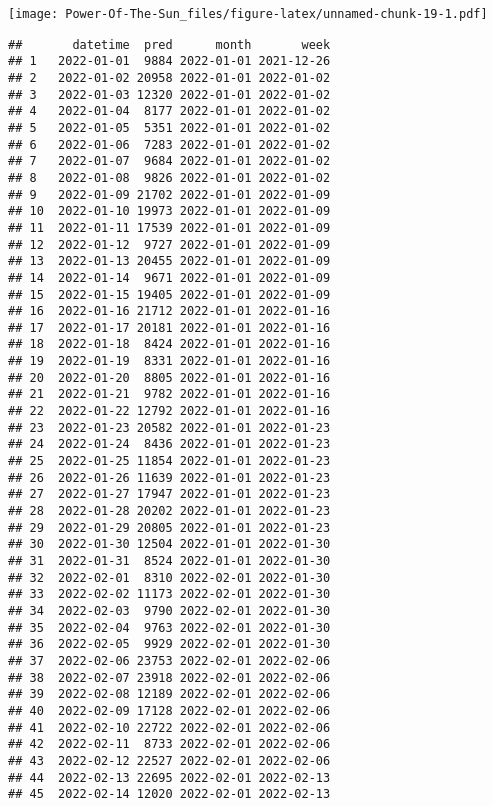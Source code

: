 \documentclass[
]{article}
\newenvironment{Shaded}{\begin{snugshade}}{\end{snugshade}}
\newcommand{\NormalTok}[1]{#1}
\newcommand{\SpecialCharTok}[1]{\textcolor[rgb]{0.81,0.36,0.00}{\textbf{#1}}}
\begin{document}
\texttt{[image: Power-Of-The-Sun\_files/figure-latex/unnamed-chunk-19-1.pdf]}

\begin{Shaded}
\end{Shaded}

\begin{verbatim}
##       datetime  pred      month       week
## 1   2022-01-01  9884 2022-01-01 2021-12-26
## 2   2022-01-02 20958 2022-01-01 2022-01-02
## 3   2022-01-03 12320 2022-01-01 2022-01-02
## 4   2022-01-04  8177 2022-01-01 2022-01-02
## 5   2022-01-05  5351 2022-01-01 2022-01-02
## 6   2022-01-06  7283 2022-01-01 2022-01-02
## 7   2022-01-07  9684 2022-01-01 2022-01-02
## 8   2022-01-08  9826 2022-01-01 2022-01-02
## 9   2022-01-09 21702 2022-01-01 2022-01-09
## 10  2022-01-10 19973 2022-01-01 2022-01-09
## 11  2022-01-11 17539 2022-01-01 2022-01-09
## 12  2022-01-12  9727 2022-01-01 2022-01-09
## 13  2022-01-13 20455 2022-01-01 2022-01-09
## 14  2022-01-14  9671 2022-01-01 2022-01-09
## 15  2022-01-15 19405 2022-01-01 2022-01-09
## 16  2022-01-16 21712 2022-01-01 2022-01-16
## 17  2022-01-17 20181 2022-01-01 2022-01-16
## 18  2022-01-18  8424 2022-01-01 2022-01-16
## 19  2022-01-19  8331 2022-01-01 2022-01-16
## 20  2022-01-20  8805 2022-01-01 2022-01-16
## 21  2022-01-21  9782 2022-01-01 2022-01-16
## 22  2022-01-22 12792 2022-01-01 2022-01-16
## 23  2022-01-23 20582 2022-01-01 2022-01-23
## 24  2022-01-24  8436 2022-01-01 2022-01-23
## 25  2022-01-25 11854 2022-01-01 2022-01-23
## 26  2022-01-26 11639 2022-01-01 2022-01-23
## 27  2022-01-27 17947 2022-01-01 2022-01-23
## 28  2022-01-28 20202 2022-01-01 2022-01-23
## 29  2022-01-29 20805 2022-01-01 2022-01-23
## 30  2022-01-30 12504 2022-01-01 2022-01-30
## 31  2022-01-31  8524 2022-01-01 2022-01-30
## 32  2022-02-01  8310 2022-02-01 2022-01-30
## 33  2022-02-02 11173 2022-02-01 2022-01-30
## 34  2022-02-03  9790 2022-02-01 2022-01-30
## 35  2022-02-04  9763 2022-02-01 2022-01-30
## 36  2022-02-05  9929 2022-02-01 2022-01-30
## 37  2022-02-06 23753 2022-02-01 2022-02-06
## 38  2022-02-07 23918 2022-02-01 2022-02-06
## 39  2022-02-08 12189 2022-02-01 2022-02-06
## 40  2022-02-09 17128 2022-02-01 2022-02-06
## 41  2022-02-10 22722 2022-02-01 2022-02-06
## 42  2022-02-11  8733 2022-02-01 2022-02-06
## 43  2022-02-12 22527 2022-02-01 2022-02-06
## 44  2022-02-13 22695 2022-02-01 2022-02-13
## 45  2022-02-14 12020 2022-02-01 2022-02-13

\end{verbatim}
\end{document}
